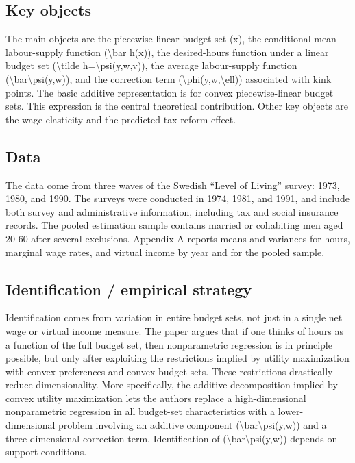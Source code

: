 \documentclass[11pt,a4paper]{article}
\begin{document}
\subsection*{Key objects}
The main objects are the piecewise-linear budget set (x), the conditional mean labour-supply function (\textbackslash{}bar h(x)), the desired-hours function under a linear budget set (\textbackslash{}tilde h=\textbackslash{}psi(y,w,v)), the average labour-supply function (\textbackslash{}bar\textbackslash{}psi(y,w)), and the correction term (\textbackslash{}phi(y,w,\textbackslash{}ell)) associated with kink points. The basic additive representation is for convex piecewise-linear budget sets. This expression is the central theoretical contribution. Other key objects are the wage elasticity and the predicted tax-reform effect.

\subsection*{Data}
The data come from three waves of the Swedish “Level of Living” survey: 1973, 1980, and 1990. The surveys were conducted in 1974, 1981, and 1991, and include both survey and administrative information, including tax and social insurance records. The pooled estimation sample contains married or cohabiting men aged 20-60 after several exclusions. Appendix A reports means and variances for hours, marginal wage rates, and virtual income by year and for the pooled sample.

\subsection*{Identification / empirical strategy}
Identification comes from variation in entire budget sets, not just in a single net wage or virtual income measure. The paper argues that if one thinks of hours as a function of the full budget set, then nonparametric regression is in principle possible, but only after exploiting the restrictions implied by utility maximization with convex preferences and convex budget sets. These restrictions drastically reduce dimensionality. More specifically, the additive decomposition implied by convex utility maximization lets the authors replace a high-dimensional nonparametric regression in all budget-set characteristics with a lower-dimensional problem involving an additive component (\textbackslash{}bar\textbackslash{}psi(y,w)) and a three-dimensional correction term. Identification of (\textbackslash{}bar\textbackslash{}psi(y,w)) depends on support conditions.
\end{document}
